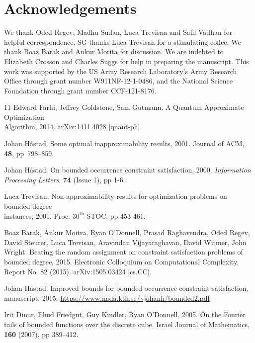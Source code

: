 \documentclass[t11pt,preprint,preprintnumbers]{revtex4}
\begin{document}
\section{Acknowledgements}

We thank Oded Regev,  Madhu Sudan,  Luca Trevisan and Salil Vadhan for helpful correspondence.  SG thanks Luca Trevisan for a stimulating coffee. We thank Boaz Barak and Ankur Morita for discussion.  We are indebted to Elizabeth Crosson and Charles Suggs for help in preparing the manuscript.  This work was supported by the US Army Research Laboratory's Army Research Office through grant number W911NF-12-1-0486, and the National Science Foundation through grant number CCF-121-8176. 

\begin{thebibliography}{11}
Edward Farhi, Jeffrey Goldstone, Sam Gutmann. A Quantum Approximate Optimization\\ Algorithm, 2014.
arXiv:1411.4028 [quant-ph].

Johan H\aa stad.  Some optimal inapproximability results, 2001. Journal of ACM, {\bf 48}, \mbox{pp 798--859.}

Johan H\aa stad. On bounded occurrence constraint satisfaction, 2000.
{\it Information Processing Letters}, {\bf 74} (Issue 1), pp 1-6.

Luca Trevisan.  Non-approximability results for optimization problems on bounded degree\\ instances, 2001.
Proc. $30^{\textrm{th}}$ STOC, pp 453-461.

Boaz Barak, Ankur Moitra, Ryan O'Donnell, Prasad Raghavendra, Oded Regev, David Steurer, Luca Trevisan, Aravindan Vijayaraghavan, David Witmer, John Wright. Beating the random assignment on constraint satisfaction problems of bounded degree, 2015. Electronic Colloquium on Computational Complexity, Report No. 82 (2015). arXiv:1505.03424 [cs.CC].

Johan H\aa stad. Improved bounds for bounded occurrence constraint satisfaction, manuscript, 2015.  \url{https://www.nada.kth.se/~johanh/bounded2.pdf}

Irit Dinur, Ehud Friedgut, Guy Kindler, Ryan O'Donnell, 2005. On the Fourier tails of bounded functions over the discrete cube. Israel Journal of Mathematics, {\bf 160} (2007), pp 389--412.

\end{thebibliography}
\end{document}
